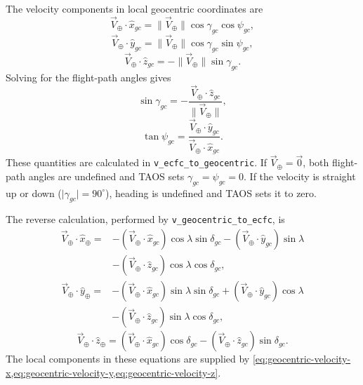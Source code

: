 The velocity components in local geocentric coordinates are
\begin{equation}
  \vec{V}_{\oplus}\cdot\hat{x}_{gc}
    = \lVert\vec{V}_{\oplus}\rVert
      \cos\gamma_{gc}\cos\psi_{gc},
  \label{eq:geocentric-velocity-x}
\end{equation}
\begin{equation}
  \vec{V}_{\oplus}\cdot\hat{y}_{gc}
    = \lVert\vec{V}_{\oplus}\rVert
      \cos\gamma_{gc}\sin\psi_{gc},
  \label{eq:geocentric-velocity-y}
\end{equation}
\begin{equation}
  \vec{V}_{\oplus}\cdot\hat{z}_{gc}
    = -\lVert\vec{V}_{\oplus}\rVert\sin\gamma_{gc}.
  \label{eq:geocentric-velocity-z}
\end{equation}
Solving for the flight-path angles gives
\begin{equation}
  \sin\gamma_{gc}
    = -\frac{\vec{V}_{\oplus}\cdot\hat{z}_{gc}}
             {\lVert\vec{V}_{\oplus}\rVert},
  \label{eq:geocentric-gamma-from-ecfc}
\end{equation}
\begin{equation}
  \tan\psi_{gc}
    = \frac{\vec{V}_{\oplus}\cdot\hat{y}_{gc}}
           {\vec{V}_{\oplus}\cdot\hat{x}_{gc}}.
  \label{eq:geocentric-psi-from-ecfc}
\end{equation}
These quantities are calculated in \texttt{v\_ecfc\_to\_geocentric}. If
$\vec{V}_{\oplus}=\vec{0}$, both flight-path angles are undefined and TAOS sets
$\gamma_{gc}=\psi_{gc}=0$. If the velocity is straight up or down
($\lvert\gamma_{gc}\rvert=90^{\circ}$), heading is undefined and TAOS sets it to
zero.

The reverse calculation, performed by
\texttt{v\_geocentric\_to\_ecfc}, is
\begin{equation}
\begin{aligned}
  \vec{V}_{\oplus}\cdot\hat{x}_{\oplus}
    ={}& -(\vec{V}_{\oplus}\cdot\hat{x}_{gc})
          \cos\lambda\sin\delta_{gc}
        -(\vec{V}_{\oplus}\cdot\hat{y}_{gc})\sin\lambda\\
       &-(\vec{V}_{\oplus}\cdot\hat{z}_{gc})
          \cos\lambda\cos\delta_{gc},
\end{aligned}
\label{eq:geocentric-to-ecfc-x}
\end{equation}
\begin{equation}
\begin{aligned}
  \vec{V}_{\oplus}\cdot\hat{y}_{\oplus}
    ={}& -(\vec{V}_{\oplus}\cdot\hat{x}_{gc})
          \sin\lambda\sin\delta_{gc}
        +(\vec{V}_{\oplus}\cdot\hat{y}_{gc})\cos\lambda\\
       &-(\vec{V}_{\oplus}\cdot\hat{z}_{gc})
          \sin\lambda\cos\delta_{gc},
\end{aligned}
\label{eq:geocentric-to-ecfc-y}
\end{equation}
\begin{equation}
  \vec{V}_{\oplus}\cdot\hat{z}_{\oplus}
    = (\vec{V}_{\oplus}\cdot\hat{x}_{gc})\cos\delta_{gc}
      -(\vec{V}_{\oplus}\cdot\hat{z}_{gc})\sin\delta_{gc}.
  \label{eq:geocentric-to-ecfc-z}
\end{equation}
The local components in these equations are supplied by
\cref{eq:geocentric-velocity-x,eq:geocentric-velocity-y,eq:geocentric-velocity-z}.
